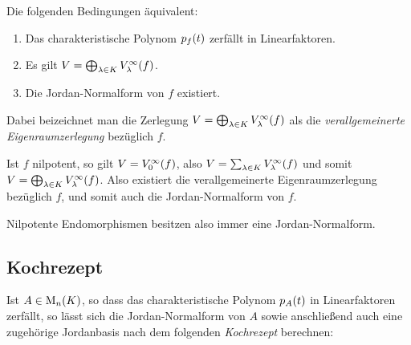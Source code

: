 \begin{theorem}
  \label{theorem: existence of generalized eigespace decomposition and jordan normal form}
  Die folgenden Bedingungen äquivalent:
  \begin{enumerate}
    \item
      Das charakteristische Polynom $\charpol{f}(t)$ zerfällt in Linearfaktoren.
    \item
      Es gilt $V = \bigoplus_{\lambda \in K} \geigenspace{V}{f}{\lambda}$.
    \item
      Die Jordan-Normalform von $f$ existiert.
  \end{enumerate}
\end{theorem}

Dabei beizeichnet man die Zerlegung $V = \bigoplus_{\lambda \in K} \geigenspace{V}{f}{\lambda}$ als die \emph{verallgemeinerte Eigenraumzerlegung} bezüglich $f$.

\begin{example}
  Ist $f$ nilpotent, so gilt $V = \geigenspace{V}{f}{0}$, also $V = \sum_{\lambda \in K} \geigenspace{V}{f}{\lambda}$ und somit $V = \bigoplus_{\lambda \in K} \geigenspace{V}{f}{\lambda}$.
  Also existiert die verallgemeinerte Eigenraumzerlegung bezüglich $f$, und somit auch die Jordan-Normalform von $f$.
  
  Nilpotente Endomorphismen besitzen also immer eine Jordan-Normalform.
\end{example}



\subsection*{Kochrezept}

Ist $A \in \matrices{n}{K}$, so dass das charakteristische Polynom $\charpol{A}(t)$ in Linearfaktoren zerfällt, so lässt sich die Jordan-Normalform von $A$ sowie anschließend auch eine zugehörige Jordanbasis nach dem folgenden \emph{Kochrezept} berechnen:

